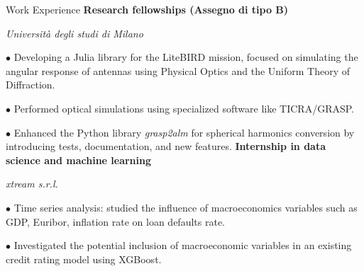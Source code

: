\begin{rubric}{Work Experience}
\entry*[2024/2025]%
    \textbf{Research fellowships (Assegno di tipo B)}
    \par\textit{Università degli studi di Milano}
    \par $\bullet$ Developing a Julia library for the LiteBIRD mission, focused on simulating the angular response of antennas using Physical Optics and the Uniform Theory of Diffraction.
    \par $\bullet$ Performed optical simulations using specialized software like TICRA/GRASP.
    \par $\bullet$ Enhanced the Python library \textit{grasp2alm} for spherical harmonics conversion by introducing tests, documentation, and new features.
\entry*[2024]%
    \textbf{Internship in data science and machine learning}
    \par \textit{xtream s.r.l.}
    \par $\bullet$ Time series analysis: studied the influence of macroeconomics variables such as GDP, Euribor, inflation rate on loan defaults rate.
    \par $\bullet$ Investigated the potential inclusion of macroeconomic variables in an existing credit rating model using XGBoost.
\end{rubric}
